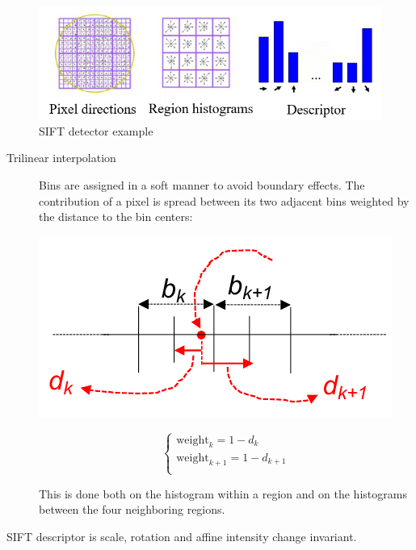 \begin{figure}[H]
    \centering
    \includegraphics[width=0.6\linewidth]{./img/sift.png}
    \caption{SIFT detector example}
\end{figure}

\begin{description}
    \item[Trilinear interpolation] 
        Bins are assigned in a soft manner to avoid boundary effects.
        The contribution of a pixel is spread between its two adjacent bins weighted by the distance to the bin centers:\\
        \begin{minipage}{0.55\linewidth}
            \centering
            \includegraphics[width=0.6\linewidth]{./img/_sift_interpolation.pdf}
        \end{minipage}
        \begin{minipage}{0.3\linewidth}
            \[ 
                \begin{cases}
                    \text{weight}_k = 1 - d_k \\
                    \text{weight}_{k+1} = 1 - d_{k+1} \\
                \end{cases}
            \]
        \end{minipage}

        This is done both on the histogram within a region and on the histograms between the four neighboring regions.
\end{description}

\begin{remark}
    SIFT descriptor is scale, rotation and affine intensity change invariant.
\end{remark}



